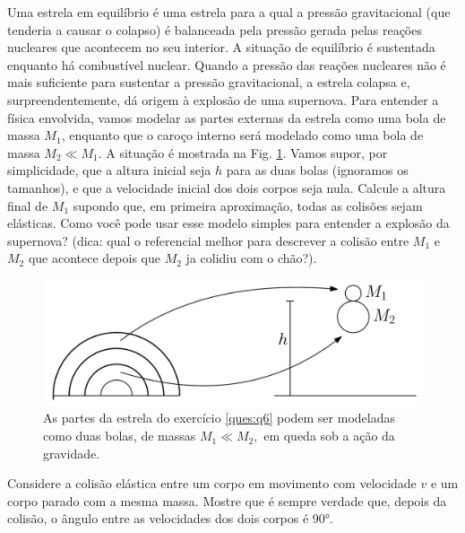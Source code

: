\documentclass[]{IMTexam}
\begin{document}
\begin{questions}
	\question \label{ques:q6}Uma estrela em equilíbrio é uma estrela para a qual a pressão gravitacional (que tenderia a causar o colapso) é balanceada pela pressão gerada pelas reações nucleares que acontecem no seu interior. A situação de equilíbrio é sustentada enquanto há combustível nuclear. Quando a pressão das reações nucleares não é mais suficiente para sustentar a  pressão gravitacional, a estrela colapsa e, surpreendentemente, dá origem à explosão de uma supernova. Para entender a física envolvida, vamos modelar as partes externas da estrela como uma bola de massa $ M_1 $, enquanto que o caroço interno será modelado como uma bola de massa $ M_2\ll M_1 $. A situação é mostrada na Fig. \ref{fig:fig1}. Vamos supor, por simplicidade, que a altura inicial seja $ h $ para as duas bolas (ignoramos os tamanhos), e que a velocidade inicial dos dois corpos seja nula. Calcule a altura final de $ M_1 $ supondo que, em primeira aproximação, todas as colisões sejam elásticas. Como você pode usar esse modelo simples para entender a explosão da supernova? (dica: qual o referencial melhor para descrever a colisão entre $ M_1 $ e $ M_2 $ que acontece depois que $ M_2 $ ja colidiu com o chão?).

	\begin{figure}[H]
		\centering
		\includegraphics[width=0.7\linewidth]{fig1}
		\caption{As partes da estrela do exercício \ref{ques:q6} podem ser modeladas como duas bolas, de massas $ M_1 \ll M_2, $ em queda sob a ação da gravidade.}
		\label{fig:fig1}
	\end{figure}

	\begin{solution}

	\end{solution}

	\question Considere a colisão elástica entre um corpo em movimento com velocidade $ v $ e um corpo parado com a mesma massa. Mostre que é sempre verdade que, depois da colisão, o ângulo entre as velocidades dos dois corpos é \ang{90}.

	\begin{solution}

	\end{solution}


\end{questions}
\end{document}
